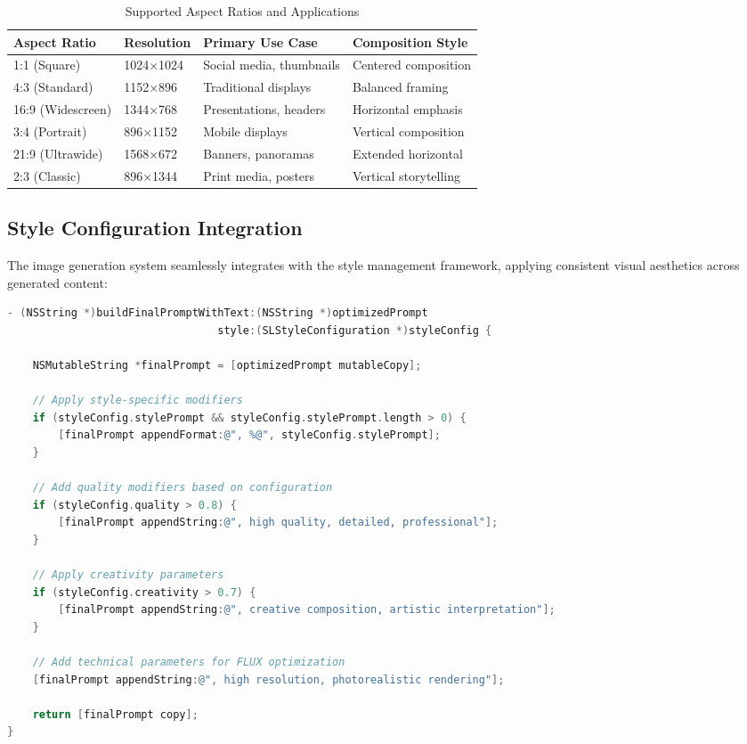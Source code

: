 \begin{table}[H]
\centering
\caption{Supported Aspect Ratios and Applications}
\label{tab:aspect_ratios}
{\begin{tabular}{llll}
\toprule
\textbf{Aspect Ratio} & \textbf{Resolution} & \textbf{Primary Use Case} & \textbf{Composition Style} \\
\midrule
1:1 (Square) & 1024×1024 & Social media, thumbnails & Centered composition \\
4:3 (Standard) & 1152×896 & Traditional displays & Balanced framing \\
16:9 (Widescreen) & 1344×768 & Presentations, headers & Horizontal emphasis \\
3:4 (Portrait) & 896×1152 & Mobile displays & Vertical composition \\
21:9 (Ultrawide) & 1568×672 & Banners, panoramas & Extended horizontal \\
2:3 (Classic) & 896×1344 & Print media, posters & Vertical storytelling \\
\bottomrule
\end{tabular}}
\end{table}

\subsection{Style Configuration Integration}

The image generation system seamlessly integrates with the style management framework, applying consistent visual aesthetics across generated content:

\begin{lstlisting}[language=C,basicstyle=\footnotesize\ttfamily,frame=single,breaklines=true,columns=flexible,caption={Style Configuration Application},label={lst:style_integration}]
- (NSString *)buildFinalPromptWithText:(NSString *)optimizedPrompt 
                                 style:(SLStyleConfiguration *)styleConfig {
    
    NSMutableString *finalPrompt = [optimizedPrompt mutableCopy];
    
    // Apply style-specific modifiers
    if (styleConfig.stylePrompt && styleConfig.stylePrompt.length > 0) {
        [finalPrompt appendFormat:@", %@", styleConfig.stylePrompt];
    }
    
    // Add quality modifiers based on configuration
    if (styleConfig.quality > 0.8) {
        [finalPrompt appendString:@", high quality, detailed, professional"];
    }
    
    // Apply creativity parameters
    if (styleConfig.creativity > 0.7) {
        [finalPrompt appendString:@", creative composition, artistic interpretation"];
    }
    
    // Add technical parameters for FLUX optimization
    [finalPrompt appendString:@", high resolution, photorealistic rendering"];
    
    return [finalPrompt copy];
}
\end{lstlisting}



